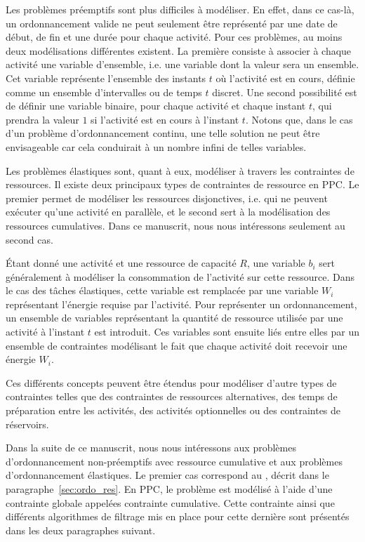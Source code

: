 Les problèmes préemptifs sont plus difficiles à modéliser. En effet,
dans ce cas-là, un ordonnancement valide ne peut seulement être
représenté par une date de début, de fin et une durée pour chaque
activité. Pour ces problèmes, au moins deux modélisations différentes
existent. La première consiste à associer à chaque activité une
variable d'ensemble, i.e. une variable dont la valeur sera un
ensemble. Cet variable représente l'ensemble des instants $t$ où
l'activité est en cours, définie comme un ensemble d'intervalles ou de
temps $t$ discret. Une second possibilité est de définir une variable
binaire, pour chaque activité et chaque instant $t$, qui prendra la
valeur $1$ si l'activité est en cours à l'instant $t$. Notons que,
dans le cas d'un problème d'ordonnancement continu, une telle solution
ne peut être envisageable car cela conduirait à un nombre infini de
telles variables.

Les problèmes élastiques sont, quant à eux, modéliser à travers les
contraintes de ressources. Il existe deux principaux types de
contraintes de ressource en PPC. Le premier permet de modéliser les
ressources disjonctives, i.e. qui ne peuvent exécuter qu'une activité
en parallèle, et le second sert à la modélisation des ressources
cumulatives. Dans ce manuscrit, nous nous intéressons seulement au
second cas. 

{\'E}tant donné une activité et une ressource de capacité $R$, une
variable $b_i$ sert généralement à modéliser la consommation de
l'activité sur cette ressource. Dans le cas des tâches élastiques,
cette variable est remplacée par une variable $W_i$ représentant
l'énergie requise par l'activité. Pour représenter un ordonnancement,
un ensemble de variables représentant la quantité de ressource
utilisée par une activité à l'instant $t$ est introduit. Ces variables
sont ensuite liés entre elles par un ensemble de contraintes
modélisant le fait que chaque activité doit recevoir une énergie
$W_i$. 

Ces différents concepts peuvent être étendus pour modéliser d'autre
types de contraintes telles que des contraintes de ressources
alternatives, des temps de préparation entre les activités, des
activités optionnelles ou des contraintes de réservoirs.

Dans la suite de ce manuscrit, nous nous intéressons aux problèmes
d'ordonnancement non-préemptifs avec ressource cumulative et aux
problèmes d'ordonnancement élastiques. Le premier cas correspond au
\CUSP, décrit dans le paragraphe~\ref{sec:ordo_res}. En PPC, le
problème est modélisé à l'aide d'une contrainte globale appelées
contrainte cumulative. Cette contrainte ainsi que différents
algorithmes de filtrage mis en place pour cette dernière sont
présentés dans les deux paragraphes suivant. 

